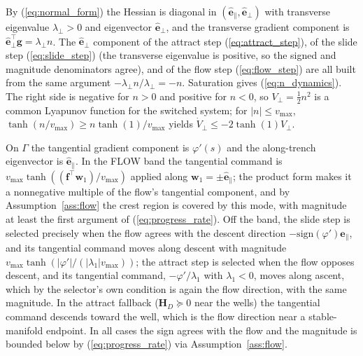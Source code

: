 \documentclass[lettersize,journal]{IEEEtran}
\begin{document}
\begin{IEEEproof}
By (\ref{eq:normal_form}) the Hessian is diagonal in
$(\hat{\mathbf{e}}_\parallel, \hat{\mathbf{e}}_\perp)$ with transverse
eigenvalue $\lambda_\perp > 0$ and eigenvector
$\hat{\mathbf{e}}_\perp$, and the transverse gradient component is
$\hat{\mathbf{e}}_\perp^\top \mathbf{g} = \lambda_\perp n$. The
$\hat{\mathbf{e}}_\perp$ component of the attract step
(\ref{eq:attract_step}), of the slide step (\ref{eq:slide_step}) (the
transverse eigenvalue is positive, so the signed and magnitude
denominators agree), and of the flow step (\ref{eq:flow_step}) are all
built from the same argument $-\lambda_\perp n / \lambda_\perp = -n$.
Saturation gives (\ref{eq:n_dynamics}). The right side is negative for $n > 0$ and
positive for $n < 0$, so $V_\perp = \tfrac{1}{2}n^2$ is a common
Lyapunov function for the switched system; for $|n| \leq v_{\max}$,
$\tanh(n/v_{\max}) \geq n \tanh(1)/v_{\max}$ yields $\dot{V}_\perp \leq
-2\tanh(1) V_\perp$.
\end{IEEEproof}

\begin{IEEEproof}
On $\Gamma$ the tangential gradient component is $\varphi'(s)$ and the
along-trench eigenvector is $\hat{\mathbf{e}}_\parallel$. In the FLOW band
the tangential command is $v_{\max}\tanh((\mathbf{f}^\top
\mathbf{w}_1)/v_{\max})$ applied along $\mathbf{w}_1 = \pm
\hat{\mathbf{e}}_\parallel$; the product form makes it a nonnegative
multiple of the flow's tangential component, and by
Assumption~\ref{ass:flow} the crest region is covered by this mode, with
magnitude at least the first argument of (\ref{eq:progress_rate}). Off
the band, the slide step is selected precisely when the flow agrees with the
descent direction $-\mathrm{sign}(\varphi')\hat{\mathbf{e}}_\parallel$,
and its tangential command moves along descent with magnitude
$v_{\max}\tanh(|\varphi'|/(|\lambda_1| v_{\max}))$; the attract step is selected
when the flow opposes descent, and its tangential command,
$-\varphi'/\lambda_1$ with $\lambda_1 < 0$, moves along ascent, which by
the selector's own condition is again the flow direction, with the same
magnitude. In the attract fallback ($\mathbf{H}_D \succeq 0$ near the
wells) the tangential command descends toward the well, which is the
flow direction near a stable-manifold endpoint. In all cases the sign
agrees with the flow and the magnitude is bounded below by
(\ref{eq:progress_rate}) via Assumption~\ref{ass:flow}.
\end{IEEEproof}
\end{document}
